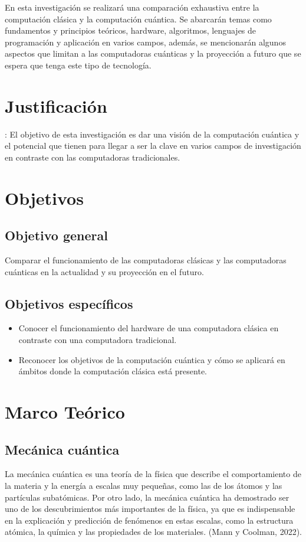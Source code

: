 \documentclass{article}
\begin{document}
En esta investigación se realizará una comparación exhaustiva entre la computación clásica y la computación cuántica. Se abarcarán temas como fundamentos y principios teóricos, hardware, algoritmos, lenguajes de programación y aplicación en varios campos, además, se mencionarán algunos aspectos que limitan a las computadoras cuánticas y la proyección a futuro que se espera que tenga este tipo de tecnología.

\newpage 
\section{Justificación}:
El objetivo de esta investigación es dar una visión de la computación cuántica y el potencial que tienen para llegar a ser la clave en varios campos de investigación en contraste con las computadoras tradicionales.

\newpage
\section{Objetivos}

\subsection{Objetivo general}
Comparar el funcionamiento de las computadoras clásicas y las computadoras cuánticas en la actualidad y su proyección en el futuro.

\subsection{Objetivos específicos}

\begin{itemize}
	\item Conocer el funcionamiento del hardware de una computadora clásica en contraste con una computadora tradicional.
	\item Reconocer los objetivos de la computación cuántica y cómo se aplicará en ámbitos donde la computación clásica está presente.
\end{itemize}

\newpage
\section{Marco Teórico}
\subsection{Mecánica cuántica} 
La mecánica cuántica es una teoría de la física que describe el comportamiento de la materia y la energía a escalas muy pequeñas, como las de los átomos y las partículas subatómicas. Por otro lado, la mecánica cuántica ha demostrado ser uno de los descubrimientos más importantes de la física, ya que es indispensable en la explicación y predicción de fenómenos en estas escalas, como la estructura atómica, la química y las propiedades de los materiales. (Mann y Coolman, 2022).
\end{document}
